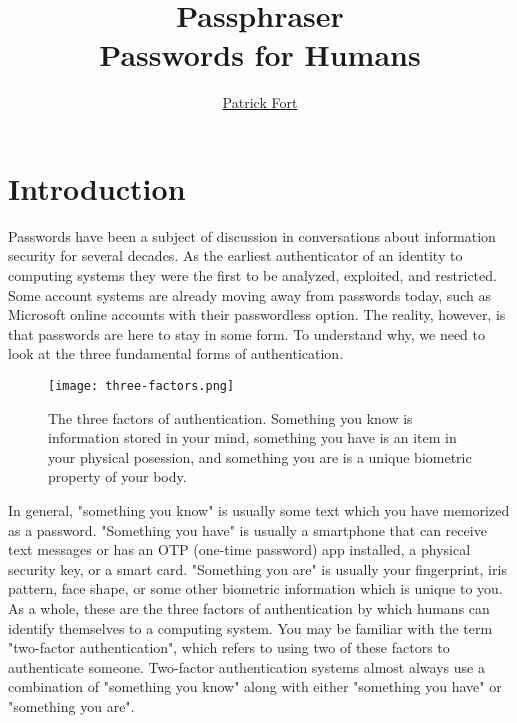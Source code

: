 \documentclass[
	a4paper, %
	10pt, %
	unnumberedsections, %
	twoside, %
]{LTJournalArticle}
\title{Passphraser \\ \small Passwords for Humans} %
\author{%
	\href{mailto:pdf@80columns.com}{Patrick Fort}
}
\begin{document}
\maketitle %


\section{Introduction}
Passwords have been a subject of discussion in conversations about information security for several decades. As the earliest authenticator of an identity to computing systems they were the first to be analyzed, exploited, and restricted. Some account systems are already moving away from passwords today, such as Microsoft online accounts with their passwordless option. The reality, however, is that passwords are here to stay in some form. To understand why, we need to look at the three fundamental forms of authentication.

\begin{figure}[h] %
	\texttt{[image: three-factors.png]}
	\caption{The three factors of authentication. Something you know is information stored in your mind, something you have is an item in your physical posession, and something you are is a unique biometric property of your body.}
\end{figure}

In general, "something you know" is usually some text which you have memorized as a password. "Something you have" is usually a smartphone that can receive text messages or has an OTP (one-time password) app installed, a physical security key, or a smart card. "Something you are" is usually your fingerprint, iris pattern, face shape, or some other biometric information which is unique to you. As a whole, these are the three factors of authentication by which humans can identify themselves to a computing system. You may be familiar with the term "two-factor authentication", which refers to using two of these factors to authenticate someone. Two-factor authentication systems almost always use a combination of "something you know" along with either "something you have" or "something you are".
\end{document}
